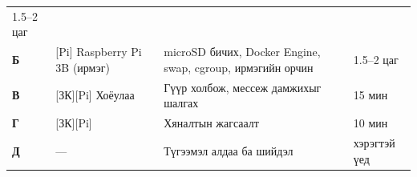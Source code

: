 \begin{longtable}[]{@{}llll@{}}
\begin{minipage}[t]{0.22\columnwidth}
1.5--2 цаг\strut
\end{minipage}\tabularnewline
\begin{minipage}[t]{0.22\columnwidth}\raggedright
\textbf{Б}\strut
\end{minipage} & \begin{minipage}[t]{0.22\columnwidth}\raggedright
{[}Pi{]} Raspberry Pi 3B (ирмэг)\strut
\end{minipage} & \begin{minipage}[t]{0.22\columnwidth}\raggedright
microSD бичих, Docker Engine, swap, cgroup, ирмэгийн орчин\strut
\end{minipage} & \begin{minipage}[t]{0.22\columnwidth}\raggedright
1.5--2 цаг\strut
\end{minipage}\tabularnewline
\begin{minipage}[t]{0.22\columnwidth}\raggedright
\textbf{В}\strut
\end{minipage} & \begin{minipage}[t]{0.22\columnwidth}\raggedright
{[}ЗК{]}{[}Pi{]} Хоёулаа\strut
\end{minipage} & \begin{minipage}[t]{0.22\columnwidth}\raggedright
Гүүр холбож, мессеж дамжихыг шалгах\strut
\end{minipage} & \begin{minipage}[t]{0.22\columnwidth}\raggedright
15 мин\strut
\end{minipage}\tabularnewline
\begin{minipage}[t]{0.22\columnwidth}\raggedright
\textbf{Г}\strut
\end{minipage} & \begin{minipage}[t]{0.22\columnwidth}\raggedright
{[}ЗК{]}{[}Pi{]}\strut
\end{minipage} & \begin{minipage}[t]{0.22\columnwidth}\raggedright
Хяналтын жагсаалт\strut
\end{minipage} & \begin{minipage}[t]{0.22\columnwidth}\raggedright
10 мин\strut
\end{minipage}\tabularnewline
\begin{minipage}[t]{0.22\columnwidth}\raggedright
\textbf{Д}\strut
\end{minipage} & \begin{minipage}[t]{0.22\columnwidth}\raggedright
---\strut
\end{minipage} & \begin{minipage}[t]{0.22\columnwidth}\raggedright
Түгээмэл алдаа ба шийдэл\strut
\end{minipage} & \begin{minipage}[t]{0.22\columnwidth}\raggedright
хэрэгтэй үед\strut
\end{minipage}\tabularnewline
\bottomrule
\end{longtable}\endgroup

